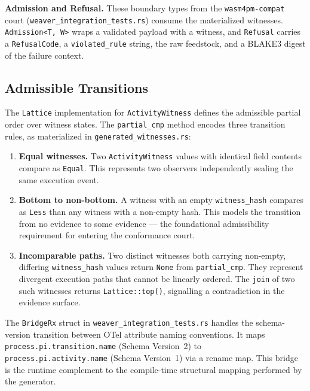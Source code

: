 \textbf{Admission and Refusal.} These boundary types from the \texttt{wasm4pm-compat}
court (\texttt{weaver\_integration\_tests.rs}) consume the materialized witnesses.
\texttt{Admission<T,\,W>} wraps a validated payload with a witness, and \texttt{Refusal}
carries a \texttt{RefusalCode}, a \texttt{violated\_rule} string, the raw feedstock, and a
BLAKE3 digest of the failure context.

\subsection{Admissible Transitions}
\label{sec:otel-weaver-exp-004-registry-to-witness-transitions}

The \texttt{Lattice} implementation for \texttt{ActivityWitness} defines the admissible
partial order over witness states. The \texttt{partial\_cmp} method encodes three
transition rules, as materialized in \texttt{generated\_witnesses.rs}:

\begin{enumerate}
  \item \textbf{Equal witnesses.} Two \texttt{ActivityWitness} values with identical field
    contents compare as \texttt{Equal}. This represents two observers independently sealing
    the same execution event.
  \item \textbf{Bottom to non-bottom.} A witness with an empty \texttt{witness\_hash}
    compares as \texttt{Less} than any witness with a non-empty hash. This models the
    transition from no evidence to some evidence --- the foundational admissibility
    requirement for entering the conformance court.
  \item \textbf{Incomparable paths.} Two distinct witnesses both carrying non-empty,
    differing \texttt{witness\_hash} values return \texttt{None} from \texttt{partial\_cmp}.
    They represent divergent execution paths that cannot be linearly ordered. The
    \texttt{join} of two such witnesses returns \texttt{Lattice::top()}, signalling
    a contradiction in the evidence surface.
\end{enumerate}

The \texttt{BridgeRx} struct in \texttt{weaver\_integration\_tests.rs} handles the
schema-version transition between OTel attribute naming conventions. It maps
\texttt{process.pi.transition.name} (Schema Version~2) to \texttt{process.pi.activity.name}
(Schema Version~1) via a rename map. This bridge is the runtime complement to the
compile-time structural mapping performed by the generator.

